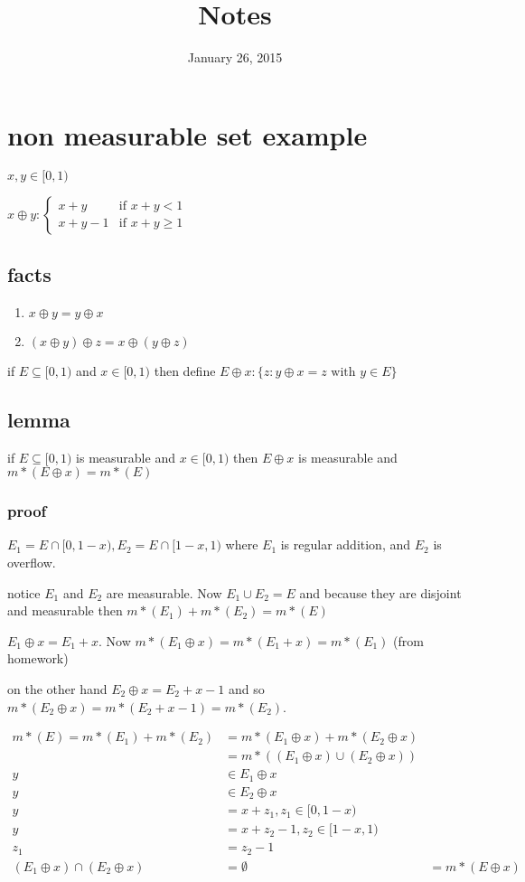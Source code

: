 \documentclass[letterpaper]{article}
\begin{document}
\title{Notes}
\date{January 26, 2015}
\maketitle
\section*{non measurable set example}
$x,y\in [0,1)$

$x\oplus y:\begin{cases}x+y&\text{if }x+y<1\\x+y-1&\text{if }x+y\ge 1\end{cases}$

\subsection*{facts}
\begin{enumerate}
\item
$x\oplus y=y\oplus x$
\item
$(x\oplus y)\oplus z=x\oplus(y\oplus z)$
\end{enumerate}

if $E\subseteq[0,1)$ and $x\in [0,1)$ then define $E\oplus x:\{z:y\oplus x=z \text{ with }y\in E\}$

\subsection*{lemma}
if $E\subseteq[0,1)$ is measurable and $x\in[0,1)$ then $E\oplus x$ is measurable and $m*(E\oplus x)=m*(E)$
\subsubsection*{proof}
$E_1=E\cap[0,1-x), E_2=E\cap[1-x,1)$ where $E_1$ is regular addition, and $E_2$ is overflow.

notice $E_1$ and $E_2$ are measurable. Now $E_1\cup E_2=E$ and because they are disjoint and measurable then $m*(E_1)+m*(E_2)=m*(E)$

$E_1\oplus x=E_1+ x$. Now $m*(E_1\oplus x)=m*(E_1+x)=m*(E_1)$ (from homework)

on the other hand $E_2\oplus x=E_2+x-1$ and so $m*(E_2\oplus x)=m*(E_2+x-1)=m*(E_2)$.

\begin{align*}
  m*(E)=m*(E_1)+m*(E_2)&=m*(E_1\oplus x)+m*(E_2\oplus x)\\
  &=m*((E_1\oplus x)\cup(E_2\oplus x))\\
  y&\in E_1\oplus x\\
  y&\in E_2\oplus x\\
  y&=x+z_1, z_1\in [0,1-x)\\
  y&=x+z_2-1, z_2\in [1-x,1)\\
  z_1&=z_2-1\\
  (E_1\oplus x)\cap (E_2\oplus x)&=\emptyset
  &=m*(E\oplus x)
\end{align*}
\end{document}
